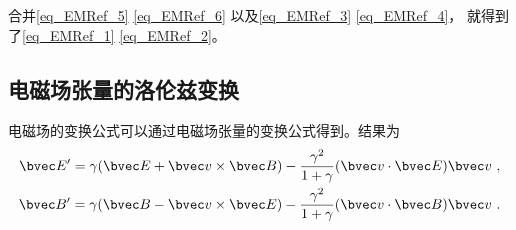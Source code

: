 合并\autoref{eq_EMRef_5} \autoref{eq_EMRef_6} 以及\autoref{eq_EMRef_3} \autoref{eq_EMRef_4}， 就得到了\autoref{eq_EMRef_1} \autoref{eq_EMRef_2}。


\subsection{电磁场张量的洛伦兹变换}

电磁场的变换公式可以通过电磁场张量的变换公式得到。结果为
\begin{equation}
\begin{aligned}
\bvec E'=\gamma(\bvec E+\bvec v\times \bvec B)-\frac{\gamma^2}{1+\gamma}(\bvec v \cdot \bvec E)\bvec v~,\\
\bvec B'=\gamma(\bvec B-\bvec v\times \bvec E)-\frac{\gamma^2}{1+\gamma}(\bvec v \cdot \bvec B)\bvec v~.
\end{aligned}
\end{equation}